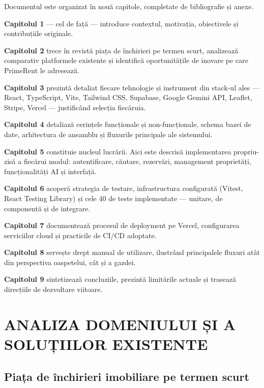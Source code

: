 \documentclass[12pt,a4paper,oneside]{report}
\begin{document}
Documentul este organizat în nouă capitole, completate de bibliografie și anexe.

\textbf{Capitolul 1} — cel de față — introduce contextul, motivația, obiectivele și contribuțiile originale.

\textbf{Capitolul 2} trece în revistă piața de închirieri pe termen scurt, analizează comparativ platformele existente și identifică oportunitățile de inovare pe care PrimeRent le adresează.

\textbf{Capitolul 3} prezintă detaliat fiecare tehnologie și instrument din stack-ul ales — React, TypeScript, Vite, Tailwind CSS, Supabase, Google Gemini API, Leaflet, Stripe, Vercel — justificând selecția fiecăruia.

\textbf{Capitolul 4} detaliază cerințele funcționale și non-funcționale, schema bazei de date, arhitectura de ansamblu și fluxurile principale ale sistemului.

\textbf{Capitolul 5} constituie nucleul lucrării. Aici este descrisă implementarea propriu-zisă a fiecărui modul: autentificare, căutare, rezervări, management proprietăți, funcționalități AI și interfață.

\textbf{Capitolul 6} acoperă strategia de testare, infrastructura configurată (Vitest, React Testing Library) și cele 40 de teste implementate — unitare, de componentă și de integrare.

\textbf{Capitolul 7} documentează procesul de deployment pe Vercel, configurarea serviciilor cloud și practicile de CI/CD adoptate.

\textbf{Capitolul 8} servește drept manual de utilizare, ilustrând principalele fluxuri atât din perspectiva oaspetelui, cât și a gazdei.

\textbf{Capitolul 9} sintetizează concluziile, prezintă limitările actuale și trasează direcțiile de dezvoltare viitoare.


\chapter{ANALIZA DOMENIULUI ȘI A SOLUȚIILOR EXISTENTE}

\section{Piața de închirieri imobiliare pe termen scurt}
\end{document}
